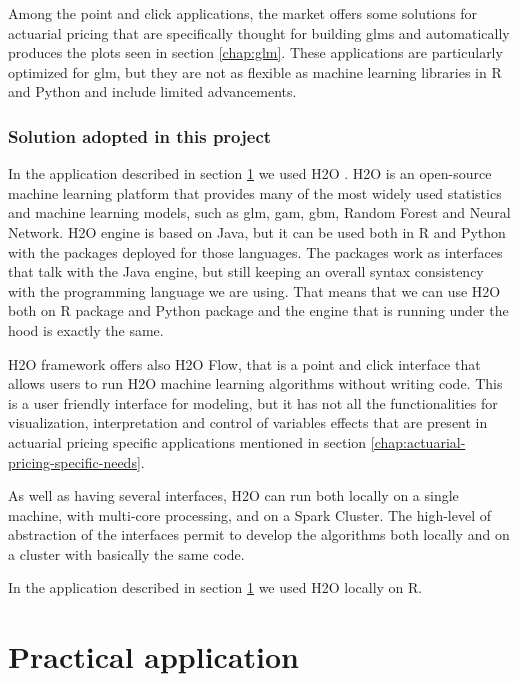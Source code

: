 \documentclass[a4paper, twoside, openright, 12pt]{report}
\theoremstyle{definition}
\theoremstyle{definition}
\theoremstyle{definition}
\theoremstyle{remark}
\begin{document}
Among the point and click applications, the market offers some solutions for actuarial pricing that are specifically thought for building \ac{glm}s and automatically produces the plots seen in section \ref{chap:glm}. These applications are particularly optimized for \ac{glm}, but they are not as flexible as machine learning libraries in R and Python and include limited advancements.

\hypertarget{solution-adopted-in-this-project}{%
\subsection{Solution adopted in this project}\label{solution-adopted-in-this-project}}

In the application described in section \ref{chap:practical-app} we used H2O \autocite{h2o_platform}. H2O is an open-source machine learning platform that provides many of the most widely used statistics and machine learning models, such as \ac{glm}, \ac{gam}, \ac{gbm}, Random Forest and Neural Network. H2O engine is based on Java, but it can be used both in R and Python with the packages deployed for those languages. The packages work as interfaces that talk with the Java engine, but still keeping an overall syntax consistency with the programming language we are using. That means that we can use H2O both on R package and Python package and the engine that is running under the hood is exactly the same.

H2O framework offers also H2O Flow, that is a point and click interface that allows users to run H2O machine learning algorithms without writing code. This is a user friendly interface for modeling, but it has not all the functionalities for visualization, interpretation and control of variables effects that are present in actuarial pricing specific applications mentioned in section \ref{chap:actuarial-pricing-specific-needs}.

As well as having several interfaces, H2O can run both locally on a single machine, with multi-core processing, and on a Spark Cluster. The high-level of abstraction of the interfaces permit to develop the algorithms both locally and on a cluster with basically the same code.

In the application described in section \ref{chap:practical-app} we used H2O locally on R.

\hypertarget{chap:practical-app}{%
\chapter{Practical application}\label{chap:practical-app}}
\end{document}
